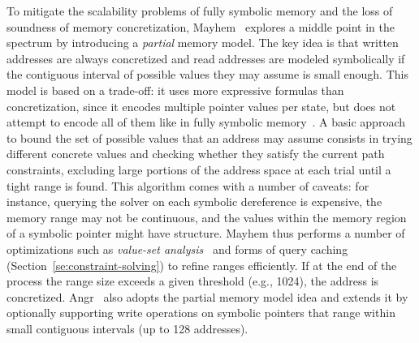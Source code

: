 To mitigate the scalability problems of fully symbolic memory and the loss of soundness of memory concretization,
{\sc Mayhem}~\cite{MAYHEM-SP12} explores a middle point in the spectrum by introducing a {\em partial} memory model. The key idea is that written addresses are always concretized and read addresses are modeled symbolically if the contiguous interval of possible values they may assume is small enough. This model is based on a trade-off: it uses more expressive formulas than concretization, since it encodes multiple pointer values per state, but does not attempt to encode all of them like in fully symbolic memory~\cite{MAYHEM-THESIS}. A basic approach to bound the set of possible values that an address may assume consists in trying different concrete values and checking whether they satisfy the current path constraints, excluding large portions of the address space at each trial until a tight range is found.  
This algorithm comes with a number of caveats: for instance, querying the solver on each symbolic dereference is expensive, the memory range may not be continuous, and the values within the memory region of a symbolic pointer might have structure. {\sc Mayhem} thus performs a number of optimizations such as {\em value-set analysis}~\cite{VSA-CC04} and forms of query caching (Section~\ref{se:constraint-solving}) to refine ranges efficiently. If at the end of the process the range size exceeds a given threshold (e.g., 1024), the address is concretized. {\sc Angr}~\cite{ANGR-SSP16} also adopts the partial memory model idea and extends it by optionally supporting write operations on symbolic pointers that range within small contiguous intervals (up to 128 addresses). %

